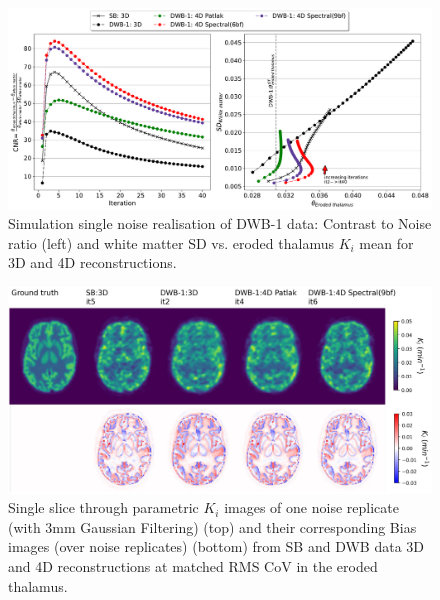 \begin{figure} [ht!]
\centering
\includegraphics[scale=0.45,angle=0]{3_Results/3_2_Dynamic_Reconstruction_SimulationStudy/figures/Single/3_8_SingleReplicate.pdf}
\caption{Simulation single noise realisation of DWB-1 data: Contrast to Noise ratio (left) and white matter SD vs. eroded thalamus $K_i$ mean for 3D and 4D reconstructions.} 
\label{fig:3_2_SingleReplicateMeanCov}
\end{figure} 

\begin{figure} [ht!]
\centering
\includegraphics[scale=0.47,angle=0]{3_Results/3_2_Dynamic_Reconstruction_SimulationStudy/figures/BrainCuts/BrainCuts.pdf}
\caption{Single slice through parametric $K_i$ images of one noise replicate (with 3mm Gaussian Filtering) (top) and their corresponding Bias images (over noise replicates) (bottom) from SB and DWB data 3D and 4D reconstructions at matched RMS CoV in the eroded thalamus.}
\label{fig:cuts_bias_matched_rms_CoV}
\end{figure} 

